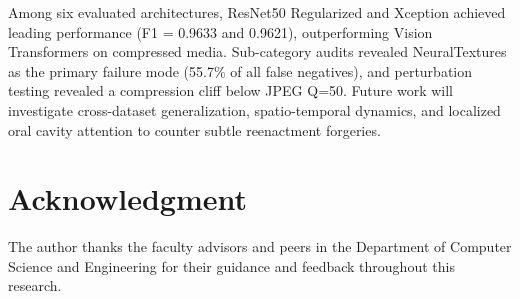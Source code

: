 \documentclass[conference]{IEEEtran}
\begin{document}
Among six evaluated architectures, ResNet50 Regularized and Xception achieved leading performance (F1 = 0.9633 and 0.9621), outperforming Vision Transformers on compressed media. Sub-category audits revealed NeuralTextures as the primary failure mode (55.7\% of all false negatives), and perturbation testing revealed a compression cliff below JPEG Q=50. Future work will investigate cross-dataset generalization, spatio-temporal dynamics, and localized oral cavity attention to counter subtle reenactment forgeries.

\FloatBarrier

\section*{Acknowledgment}
The author thanks the faculty advisors and peers in the Department of Computer Science and Engineering for their guidance and feedback throughout this research.



\end{document}
